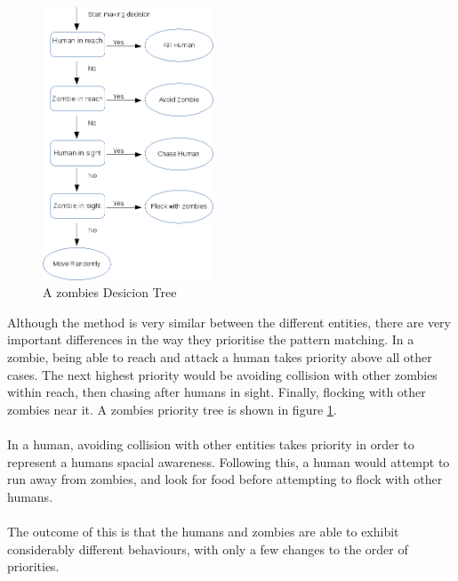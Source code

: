 \documentclass[10pt, a4paper, conference, compsocconf]{IEEEtran}
\begin{document}
\begin{figure}[h]
  \centering
  \includegraphics[width=2in]{../img/zombie_decision_tree.png}
\caption{A zombies Desicion Tree}
    \label{fig:zomb_tree}
\end{figure}

Although the method is very similar between the different entities, there are very important differences in the way they prioritise the pattern matching. In a zombie, being able to reach and attack a human takes priority above all other cases. The next highest priority would be avoiding collision with other zombies within reach, then chasing after humans in sight. Finally, flocking with other zombies near it. A zombies priority tree is shown in figure \ref{fig:zomb_tree}.\\
\\
In a human, avoiding collision with other entities takes priority in order to represent a humans spacial awareness. Following this, a human would attempt to run away from zombies, and look for food before attempting to flock with other humans.\\
\\
The outcome of this is that the humans and zombies are able to exhibit considerably different behaviours, with only a few changes to the order of priorities.\\
\end{document}
